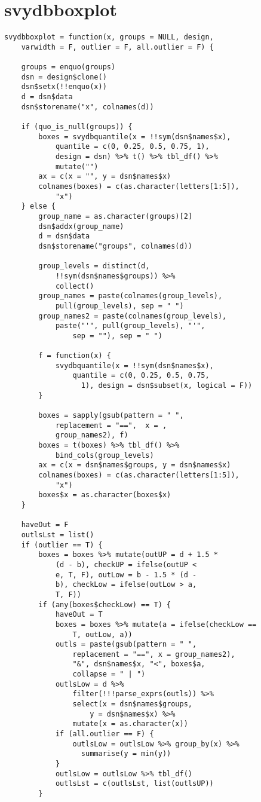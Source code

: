 \section{svydbboxplot}

\begin{lstlisting}
svydbboxplot = function(x, groups = NULL, design, 
    varwidth = F, outlier = F, all.outlier = F) {
    
    groups = enquo(groups)
    dsn = design$clone()
    dsn$setx(!!enquo(x))
    d = dsn$data
    dsn$storename("x", colnames(d))
    
    if (quo_is_null(groups)) {
        boxes = svydbquantile(x = !!sym(dsn$names$x), 
            quantile = c(0, 0.25, 0.5, 0.75, 1), 
            design = dsn) %>% t() %>% tbl_df() %>% 
            mutate("")
        ax = c(x = "", y = dsn$names$x)
        colnames(boxes) = c(as.character(letters[1:5]), 
            "x")
    } else {
        group_name = as.character(groups)[2]
        dsn$addx(group_name)
        d = dsn$data
        dsn$storename("groups", colnames(d))
        
        group_levels = distinct(d, 
            !!sym(dsn$names$groups)) %>% 
            collect()
        group_names = paste(colnames(group_levels), 
            pull(group_levels), sep = " ")
        group_names2 = paste(colnames(group_levels), 
            paste("'", pull(group_levels), "'", 
                sep = ""), sep = " ")
        
        f = function(x) {
            svydbquantile(x = !!sym(dsn$names$x), 
                quantile = c(0, 0.25, 0.5, 0.75, 
                  1), design = dsn$subset(x, logical = F))
        }
        
        boxes = sapply(gsub(pattern = " ", 
            replacement = "==",  x = , 
            group_names2), f)
        boxes = t(boxes) %>% tbl_df() %>% 
            bind_cols(group_levels)
        ax = c(x = dsn$names$groups, y = dsn$names$x)
        colnames(boxes) = c(as.character(letters[1:5]), 
            "x")
        boxes$x = as.character(boxes$x)
    }
    
    haveOut = F
    outlsLst = list()
    if (outlier == T) {
        boxes = boxes %>% mutate(outUP = d + 1.5 * 
            (d - b), checkUP = ifelse(outUP < 
            e, T, F), outLow = b - 1.5 * (d - 
            b), checkLow = ifelse(outLow > a, 
            T, F))
        if (any(boxes$checkLow) == T) {
            haveOut = T
            boxes = boxes %>% mutate(a = ifelse(checkLow == 
                T, outLow, a))
            outls = paste(gsub(pattern = " ", 
                replacement = "==", x = group_names2), 
                "&", dsn$names$x, "<", boxes$a, 
                collapse = " | ")
            outlsLow = d %>% 
                filter(!!!parse_exprs(outls)) %>% 
                select(x = dsn$names$groups, 
                    y = dsn$names$x) %>% 
                mutate(x = as.character(x))
            if (all.outlier == F) {
                outlsLow = outlsLow %>% group_by(x) %>% 
                  summarise(y = min(y))
            }
            outlsLow = outlsLow %>% tbl_df()
            outlsLst = c(outlsLst, list(outlsUP))
        }
        

\end{lstlisting}
